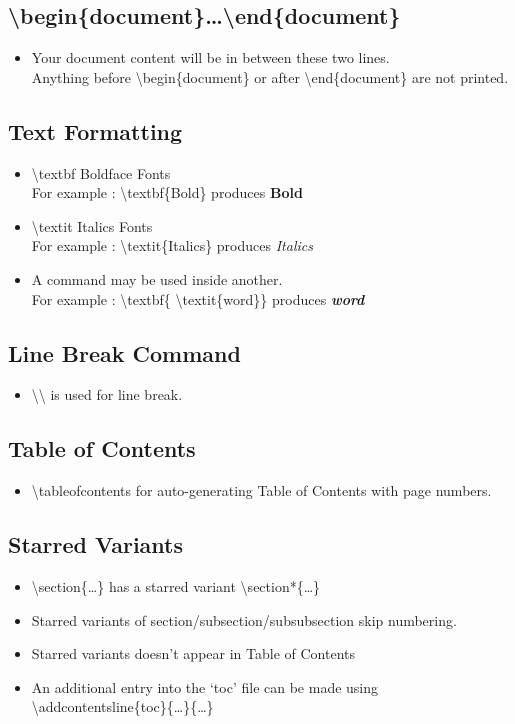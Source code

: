 \documentclass{article}
\begin{document}
\subsection{\textbackslash{}begin\{document\}\dots\textbackslash{}end\{document\}}
\begin{itemize}
	\item Your document content will be in between these two lines.\\ Anything before \textbackslash{}begin\{document\} or after \textbackslash{}end\{document\} are not printed.
\end{itemize}

\subsection{Text Formatting}
\begin{itemize}
	\item \textbackslash{}textbf Boldface Fonts\\ For example : \textbackslash{}textbf\{Bold\} produces \textbf{Bold}
	\item \textbackslash{}textit Italics Fonts\\ For example : \textbackslash{}textit\{Italics\} produces \textit{Italics}
	\item A command may be used inside another. \\  For example : \textbackslash{}textbf\{ \textbackslash{}textit\{word\}\} produces \textbf{\textit{word}}
\end{itemize}

\subsection{Line Break Command}
\begin{itemize}
	\item \textbackslash{}\textbackslash{} is used for line break.
\end{itemize}

\subsection{Table of Contents}
\begin{itemize}
	\item \textbackslash{}tableofcontents for auto-generating Table of Contents with page numbers.
\end{itemize}

\subsection{Starred Variants}
\begin{itemize}
	\item \textbackslash{}section\{\dots\} has a starred variant \textbackslash{}section*\{\dots\}
	\item Starred variants of section/subsection/subsubsection skip numbering.
	\item Starred variants doesn't appear in Table of Contents
	\item An additional entry into the `toc' file can be made using \textbackslash{}addcontentsline\{toc\}\{\dots\}\{\dots\}
\end{itemize}
\end{document}
